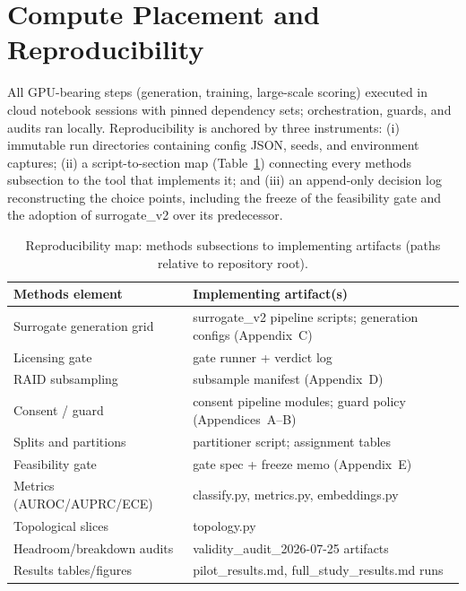 \section{Compute Placement and Reproducibility}
All GPU-bearing steps (generation, training, large-scale scoring) executed
in cloud notebook sessions with pinned dependency sets; orchestration,
guards, and audits ran locally. Reproducibility is anchored by three
instruments: (i) immutable run directories containing config JSON, seeds,
and environment captures; (ii) a script-to-section map
(Table~\ref{tab:repro}) connecting every methods subsection to the tool
that implements it; and (iii) an append-only decision log reconstructing
the choice points, including the freeze of the feasibility gate and the
adoption of surrogate\_v2 over its predecessor.

\begin{table}[t]
\centering\small
\caption{Reproducibility map: methods subsections to implementing
artifacts (paths relative to repository root).}
\label{tab:repro}
\begin{tabular}{p{5.2cm}p{6.8cm}}
\toprule
Methods element & Implementing artifact(s) \\
\midrule
Surrogate generation grid & surrogate\_v2 pipeline scripts; generation
configs (Appendix~C) \\
Licensing gate & gate runner + verdict log \\
RAID subsampling & subsample manifest (Appendix~D) \\
Consent / guard & consent pipeline modules; guard policy (Appendices~A--B) \\
Splits and partitions & partitioner script; assignment tables \\
Feasibility gate & gate spec + freeze memo (Appendix~E) \\
Metrics (AUROC/AUPRC/ECE) & classify.py, metrics.py, embeddings.py \\
Topological slices & topology.py \\
Headroom/breakdown audits & validity\_audit\_2026-07-25 artifacts \\
Results tables/figures & pilot\_results.md, full\_study\_results.md runs \\
\bottomrule
\end{tabular}
\end{table}

